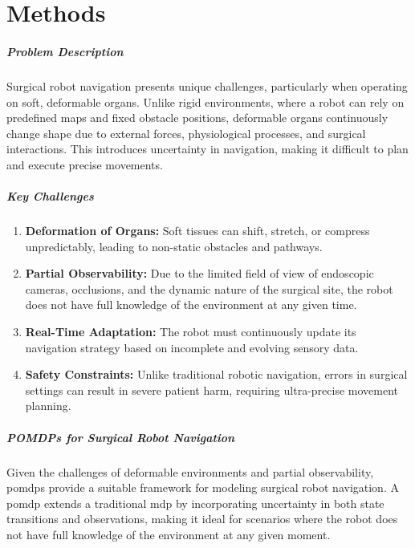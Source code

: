 \chapter{Methods}

\paragraph{Problem Description}
Surgical robot navigation presents unique challenges, particularly when operating on soft, deformable organs. Unlike rigid environments, where a robot can rely on predefined maps and fixed obstacle positions, deformable organs continuously change shape due to external forces, physiological processes, and surgical interactions. This introduces uncertainty in navigation, making it difficult to plan and execute precise movements.

\paragraph{Key Challenges}
\begin{enumerate}
\item \textbf{Deformation of Organs:} Soft tissues can shift, stretch, or compress unpredictably, leading to non-static obstacles and pathways.
\item \textbf{Partial Observability:} Due to the limited field of view of endoscopic cameras, occlusions, and the dynamic nature of the surgical site, the robot does not have full knowledge of the environment at any given time.
\item \textbf{Real-Time Adaptation:} The robot must continuously update its navigation strategy based on incomplete and evolving sensory data.
\item \textbf{Safety Constraints:} Unlike traditional robotic navigation, errors in surgical settings can result in severe patient harm, requiring ultra-precise movement planning.
\end{enumerate}

\paragraph{POMDPs for Surgical Robot Navigation}
Given the challenges of deformable environments and partial observability, \glspl{pomdp} provide a suitable 
framework for modeling surgical robot navigation. A \gls{pomdp} extends a traditional \gls{mdp} by incorporating 
uncertainty in both state transitions and observations, making it ideal for scenarios where the robot 
does not have full knowledge of the environment at any given moment.


